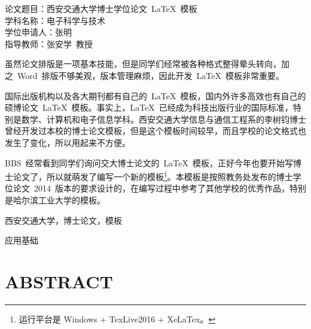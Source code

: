 
\titlespacing{\chapter}{0pt}{23mm}{6mm}

\setcounter{page}{1}
\vskip-50mm
{\hei \xiaosi
	\noindent 论文题目：西安交通大学博士学位论文~\LaTeX~模板 \\
	\noindent 学科名称：电子科学与技术 \\
	\noindent 学位申请人：张明 \\
	\noindent 指导教师：张安学~教授
}
\vskip24mm


虽然论文排版是一项基本技能，但是同学们经常被各种格式整得晕头转向，加之~Word~排版不够美观，版本管理麻烦，因此开发~\LaTeX~模板非常重要。

国际出版机构以及各大期刊都有自己的~\LaTeX~模板，国内外许多高效也有自己的硕博论文~\LaTeX~模板。事实上，\LaTeX~已经成为科技出版行业的国际标准，特别是数学、计算机和电子信息学科。西安交通大学信息与通信工程系的李树钧博士曾经开发过本校的博士论文模板，但是这个模板时间较早，而且学校的论文格式也发生了变化，所以用起来不方便。

BBS~经常看到同学们询问交大博士论文的~\LaTeX~模板，正好今年也要开始写博士论文了，所以就萌发了编写一个新的模板\footnote{运行平台是 \color{red}Windows + TexLive2016 + XeLaTex。}。本模板是按照教务处发布的博士学位论文~2014~版本的要求设计的，在编写过程中参考了其他学校的优秀作品，特别是哈尔滨工业大学的模板。

\vspace{\baselineskip}
 西安交通大学，博士论文，模板

\vspace{\baselineskip}
 应用基础
\clearpage

\titlespacing{\chapter}{0pt}{20.5mm}{5mm}
\chapter*{ABSTRACT}
{}


